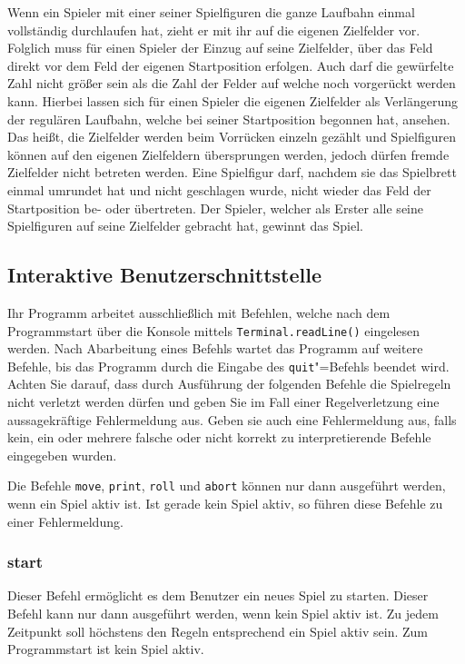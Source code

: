 \documentclass[
  name=\assignment,
  start=\releasedate,
  end=\duedate,
  subject=\lecture\,--\,\semester,
  group=\group,
  url=\theurl,
  author=\authors,
  mail=\themail
]{assignment}
\begin{document}
Wenn ein Spieler mit einer seiner Spielfiguren die ganze Laufbahn einmal vollständig durchlaufen hat, zieht er mit ihr auf die eigenen Zielfelder vor. Folglich muss für einen Spieler der Einzug auf seine Zielfelder, über das Feld direkt vor dem Feld der eigenen Startposition erfolgen. Auch darf die gewürfelte Zahl nicht größer sein als die Zahl der Felder auf welche noch vorgerückt werden kann. Hierbei lassen sich für einen Spieler die eigenen Zielfelder als Verlängerung der regulären Laufbahn, welche bei seiner Startposition begonnen hat, ansehen. Das heißt, die Zielfelder werden beim Vorrücken einzeln gezählt und Spielfiguren können auf den eigenen Zielfeldern übersprungen werden, jedoch dürfen fremde Zielfelder nicht betreten werden. Eine Spielfigur darf, nachdem sie das Spielbrett einmal umrundet hat und nicht geschlagen wurde, nicht wieder das Feld der Startposition be- oder übertreten. Der Spieler, welcher als Erster alle seine Spielfiguren auf seine Zielfelder gebracht hat, gewinnt das Spiel.

\subsection*{Interaktive Benutzerschnittstelle}
Ihr Programm arbeitet ausschließlich mit Befehlen, welche nach dem Programmstart über die Konsole mittels \texttt{Terminal.readLine()} eingelesen werden. Nach Abarbeitung eines Befehls wartet das Programm auf weitere Befehle, bis das Programm durch die Eingabe des \texttt{quit}"=Befehls beendet wird. Achten Sie darauf, dass durch Ausführung der folgenden Befehle die Spielregeln nicht verletzt werden dürfen und geben Sie im Fall einer Regelverletzung eine aussagekräftige Fehlermeldung aus. Geben sie auch eine Fehlermeldung aus, falls kein, ein oder mehrere falsche oder nicht korrekt zu interpretierende Befehle eingegeben wurden.

Die Befehle \texttt{move}, \texttt{print}, \texttt{roll} und \texttt{abort} können nur dann ausgeführt werden, wenn ein Spiel aktiv ist. Ist gerade kein Spiel aktiv, so führen diese Befehle zu einer Fehlermeldung.

\subsubsection*{start}
Dieser Befehl ermöglicht es dem Benutzer ein neues Spiel zu starten. Dieser Befehl kann nur dann ausgeführt werden, wenn kein Spiel aktiv ist. Zu jedem Zeitpunkt soll höchstens den Regeln entsprechend ein Spiel aktiv sein. Zum Programmstart ist kein Spiel aktiv.
\end{document}
